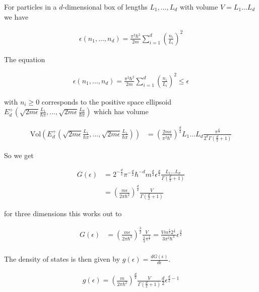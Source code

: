 \documentclass[12pt]{article}
\newcommand{\ep}{\epsilon}
\begin{document}
For particles in a $d$-dimensional box of lengths $L_1,\ldots, L_d$ with volume $V=L_1\ldots L_d$ we have 

\begin{align}
\ep(n_1,\ldots, n_d) = \frac{\pi^2 \hbar^2}{2m} \sum_{i=1}^d \left(\frac{n_i}{L_i}\right)^2
\end{align}

The equation

\begin{align}
\ep(n_1,\ldots, n_d) = \frac{\pi^2 \hbar^2}{2m} \sum_{i=1}^d \left(\frac{n_i}{L_i}\right)^2 \le \epsilon
\end{align}

with $n_i \ge 0$ corresponds to the positive space ellipsoid $E_d^+\left(\sqrt{2m\epsilon} \frac{L_1}{\hbar \pi}, \ldots, \sqrt{2m\epsilon} \frac{L_d}{\hbar \pi}\right)$ which has volume

\begin{align}
\text{Vol}\left(E_d^+\left(\sqrt{2m\epsilon} \frac{L_1}{\hbar \pi}, \ldots, \sqrt{2m\epsilon} \frac{L_1}{\hbar \pi}\right)\right)
&= \left(\frac{2m\ep}{\pi^2 \hbar^2} \right)^{\frac{d}{2}} L_1\ldots L_d \frac{\pi^{\frac{d}{2}}}{2^d \Gamma\left(\frac{d}{2}+1\right)}
\end{align}

So we get

\begin{align}
G(\ep) &= 2^{-\frac{d}{2}}\pi^{-\frac{d}{2}} \hbar^{-d} m^{\frac{d}{2}}\ep^{\frac{d}{2}} \frac{L_1\ldots L_d}{\Gamma\left(\frac{d}{2}+1\right)}\\
&= \left(\frac{m \ep}{2\pi \hbar^2}\right)^{\frac{d}{2}}\frac{V}{\Gamma\left(\frac{d}{2}+1\right)}
\end{align}

for three dimensions this works out to

\begin{align}
G(\ep)&=\left(\frac{m\ep}{2\pi \hbar^2} \right)^{\frac{3}{2}} \frac{V}{\frac{3}{4} \pi^{\frac{1}{2}}} = \frac{V m^{\frac{3}{2}} 2^{\frac{1}{2}}}{3\pi^2 \hbar^3} \ep^{\frac{3}{2}}\\
\end{align}

The density of states is then given by $g(\ep) = \frac{dG(\ep)}{d\ep}$.

\begin{align}
g(\ep) = \left(\frac{m}{2\pi\hbar^2} \right)^{\frac{d}{2}} \frac{V}{\Gamma\left(\frac{d}{2}+1\right)} \frac{d}{2} \ep^{\frac{d}{2}-1}
\end{align}
\end{document}
